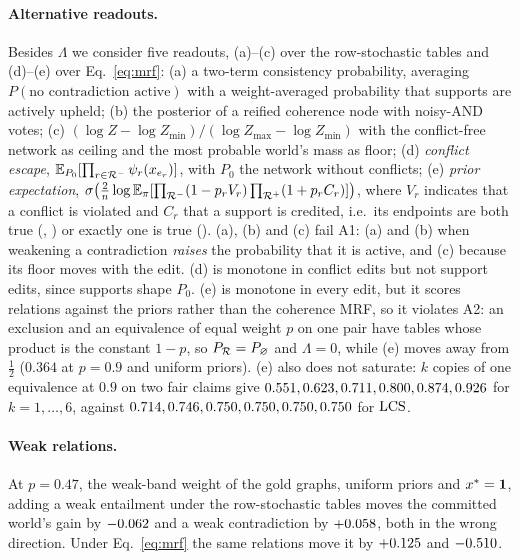\paragraph{Alternative readouts.} Besides $\Lambda$ we consider five readouts, (a)--(c) over the
row-stochastic tables and (d)--(e) over Eq.~\ref{eq:mrf}:
(a) a two-term consistency probability, averaging $P(\text{no contradiction active})$ with a
weight-averaged probability that supports are actively upheld;
(b) the posterior of a reified coherence node with noisy-AND votes;
(c) $(\log Z-\log Z_{\min})/(\log Z_{\max}-\log Z_{\min})$ with the conflict-free network as
ceiling and the most probable world's mass as floor;
(d) \emph{conflict escape}, $\mathbb{E}_{P_0}[\prod_{r\in\mathcal{R}^{-}}\psi_r(x_{e_r})]$, with $P_0$ the
network without conflicts;
(e) \emph{prior expectation}, $\sigma\bigl(\frac2n\log\mathbb{E}_\pi[\prod_{\mathcal{R}^{-}}(1-p_rV_r)
\prod_{\mathcal{R}^{+}}(1+p_rC_r)]\bigr)$, where $V_r$ indicates that a conflict is violated and $C_r$ that a
support is credited, i.e.\ its endpoints are both true (\ent{}, \eqv{}) or exactly one is true
(\cnc{}).
(a), (b) and (c) fail A1: (a) and (b) when weakening a contradiction \emph{raises} the
probability that it is active, and (c) because its floor moves with the edit. (d) is monotone in
conflict edits but not support edits, since supports shape $P_0$. (e) is monotone in every edit, but it scores relations against the priors rather than the
coherence MRF, so it violates A2: an exclusion and an equivalence of equal weight $p$ on one pair
have tables whose product is the constant $1-p$, so $P_{\mathcal{R}}=P_\varnothing$ and $\Lambda=0$, while (e)
moves away from $\frac12$ ($0.364$ at $p=0.9$ and uniform priors). (e) also does not saturate: $k$
copies of one equivalence at $0.9$ on two fair claims give
$0.551,0.623,0.711,0.800,0.874,0.926$ for $k=1,\dots,6$, against
$0.714,0.746,0.750,0.750,0.750,0.750$ for $\mathrm{LCS}$.

\paragraph{Weak relations.} At $p=0.47$, the weak-band weight of the gold graphs, uniform priors and
$x^{\ast}=\mathbf{1}$, adding a weak entailment under the row-stochastic tables moves the committed world's
gain by $-0.062$ and a weak contradiction by $+0.058$, both in the wrong
direction. Under Eq.~\ref{eq:mrf} the same relations move it by $+0.125$ and
$-0.510$.

